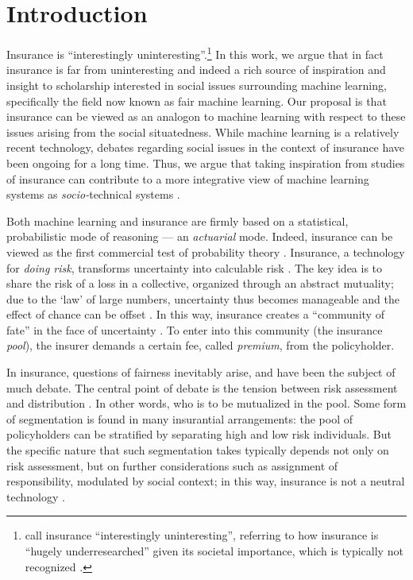 \documentclass[11pt]{article} %
\begin{document}
\section{Introduction}
Insurance is ``interestingly uninteresting''.\footnote{\citet{mcfall2020personalisation} call insurance ``interestingly uninteresting'', referring to how insurance is ``hugely underresearched'' given its societal importance, which is typically not recognized \citep{ewald1989versicherungs}.} 
In this work, we argue that in fact insurance is far from uninteresting and indeed a rich source of inspiration and insight to scholarship interested in social issues surrounding machine learning, specifically the field now known as fair machine learning. Our proposal is that insurance can be viewed as an analogon to machine learning with respect to these issues arising from the social situatedness. While machine learning is a relatively recent technology, debates regarding social issues in the context of insurance have been ongoing for a long time. Thus, we argue that taking inspiration from studies of insurance can contribute to a more integrative view of machine learning systems as \textit{socio-}technical systems \citep{sociotechnical}. 

Both machine learning and insurance are firmly based on a statistical, probabilistic mode of reasoning --- an \textit{actuarial} mode. Indeed, insurance can be viewed as the first commercial test of probability theory \citep{gigerenzer1989empire,mcfall2011good}. Insurance, a technology for \textit{doing risk}, transforms uncertainty into calculable risk \citep{lehtonen2014editorial}. The key idea is to share the risk of a loss in a collective, organized through an abstract mutuality; due to the `law' of large numbers, uncertainty thus becomes manageable and the effect of chance can be offset \citep{ewald1991insurance}. In this way, insurance creates a ``community of fate'' in the face of uncertainty \citep{heimer1985reactive}. To enter into this community (the insurance \textit{pool}), the insurer demands a certain fee, called \textit{premium}, from the policyholder.

In insurance, questions of fairness inevitably arise, and have been the subject of much debate. The central point of debate is the tension between risk assessment and distribution \citep{abraham1985efficiency}. In other words, who is to be mutualized in the pool. Some form of segmentation is found in many insurantial arrangements: the pool of policyholders can be stratified by separating high and low risk individuals. But the specific nature that such segmentation takes typically depends not only on risk assessment, but on further considerations such as assignment of responsibility, modulated by social context; in this way, insurance is not a neutral technology \citep{baker2002embracing,glenn2003postmodernism}. 
\end{document}
